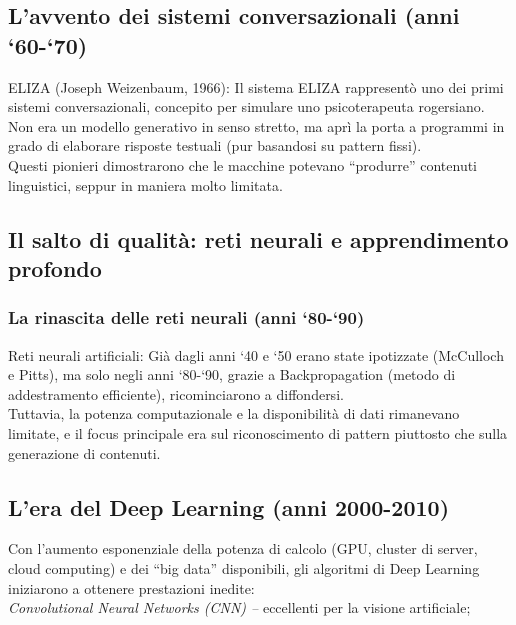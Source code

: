 \documentclass[14pt]{extbook}
\begin{document}
\subsection{L’avvento dei sistemi conversazionali (anni ‘60-‘70)}

ELIZA (Joseph Weizenbaum, 1966): Il sistema ELIZA \cite{weizenbaum1966eliza} rappresentò uno dei primi sistemi conversazionali, concepito per simulare uno psicoterapeuta rogersiano. Non era un modello generativo in senso stretto, ma aprì la porta a programmi in grado di elaborare risposte testuali (pur basandosi su pattern fissi). \\

Questi pionieri dimostrarono che le macchine potevano “produrre” contenuti linguistici, seppur in maniera molto limitata.\\

\subsection{Il salto di qualità: reti neurali e apprendimento profondo}
\subsubsection{La rinascita delle reti neurali (anni ‘80-‘90)}

Reti neurali artificiali: Già dagli anni ‘40 e ‘50 erano state ipotizzate (McCulloch e Pitts), ma solo negli anni ‘80-‘90, grazie a Backpropagation (metodo di addestramento efficiente), ricominciarono a diffondersi.\\

Tuttavia, la potenza computazionale e la disponibilità di dati rimanevano limitate, e il focus principale era sul riconoscimento di pattern piuttosto che sulla generazione di contenuti.\\

\subsection{L’era del Deep Learning (anni 2000-2010)}

Con l’aumento esponenziale della potenza di calcolo (GPU, cluster di server, cloud computing) e dei “big data” disponibili, gli algoritmi di Deep Learning iniziarono a ottenere prestazioni inedite:\\

\textit{Convolutional Neural Networks (CNN) –} eccellenti per la visione artificiale;\\
\end{document}
